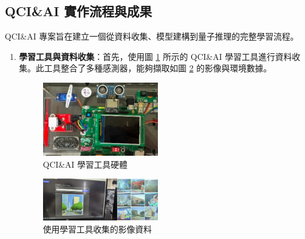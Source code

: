 \documentclass[twocolumn,11pt,a4paper]{article}
\begin{document}
\subsection{QCI\&AI 實作流程與成果}
QCI\&AI 專案旨在建立一個從資料收集、模型建構到量子推理的完整學習流程。
\begin{enumerate}
    \item \textbf{學習工具與資料收集}：首先，使用圖 \ref{fig:lerning_tool} 所示的 QCI\&AI 學習工具進行資料收集。此工具整合了多種感測器，能夠擷取如圖 \ref{fig:collection_data} 的影像與環境數據。
    \begin{figure}[htbp]
        \centering
        \includegraphics[width=0.48\textwidth]{res/image/lerning_tool.png}
        \caption{QCI\&AI 學習工具硬體}
        \label{fig:lerning_tool}
    \end{figure}
    \begin{figure}[htbp]
        \centering
        \includegraphics[width=0.48\textwidth]{res/image/collection_data.png}
        \caption{使用學習工具收集的影像資料}
        \label{fig:collection_data}
    \end{figure}
    

\end{enumerate}
\end{document}
